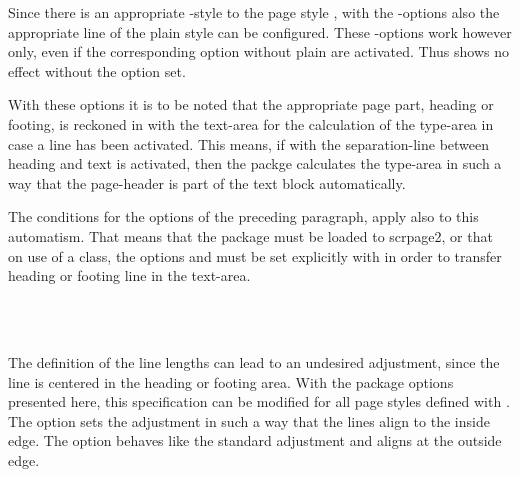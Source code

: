 Since there is an appropriate -style to the page style
, with the -options also the
appropriate line of the plain style can be configured.
These -options work however only, even if the
corresponding option without plain are activated.
Thus  shows no effect without the
 option set.

With these options it is to be noted that the appropriate page part,
heading or footing, is reckoned in with the text-area
for the calculation of the type-area in case a line has been activated.
This means, if with  the separation-line 
between heading and text is activated, then the packge 
calculates the type-area in such a way that the page-header
is part of the text block automatically.

The conditions for the options of the preceding paragraph, apply also to
this automatism. That means that the package 
must be loaded to scrpage2, or that on use of a \KOMAScript{} class,
the options  and 
must be set explicitly with  in order to
transfer heading or footing line in the text-area.
%

%
%
%
%
\begin{Declaration}
\\
\\
\end{Declaration}%
%
The definition of the line lengths can lead to an
undesired adjustment, since
the line is centered in the heading or footing area.
With the package options presented here, this specification can be
modified for all page styles defined with .
The option  sets the adjustment in such a
way that the lines align to the inside edge.
The option  behaves like the standard adjustment and
 aligns at the outside edge.

